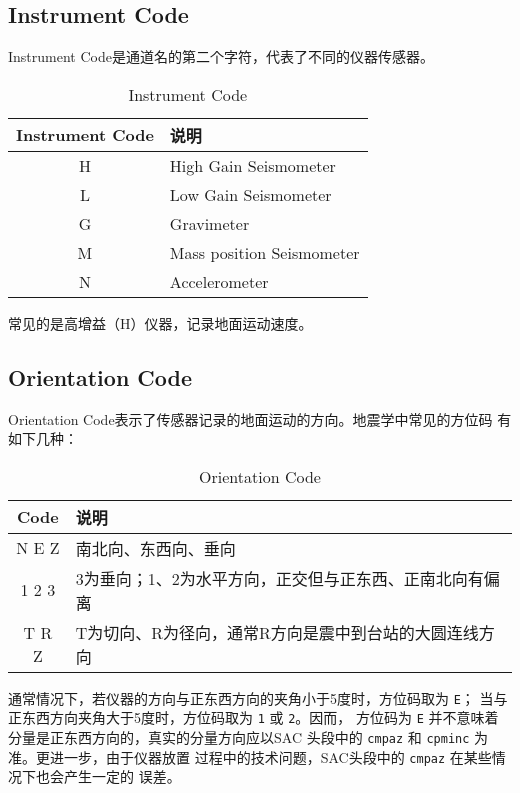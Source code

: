 \subsection{Instrument Code}
Instrument Code是通道名的第二个字符，代表了不同的仪器传感器。
\begin{table}[H]
\centering
\caption{Instrument Code}
\begin{tabular}{cl}
\toprule
Instrument Code    &     说明   \\
\midrule
H        &       High Gain Seismometer      \\
L        &       Low Gain Seismometer       \\
G        &       Gravimeter                 \\
M        &       Mass position Seismometer  \\
N        &       Accelerometer              \\
\bottomrule
\end{tabular}
\end{table}
常见的是高增益（H）仪器，记录地面运动速度。

\subsection{Orientation Code}
Orientation Code表示了传感器记录的地面运动的方向。地震学中常见的方位码
有如下几种：
\begin{table}[H]
\centering
\caption{Orientation Code}
\begin{tabular}{cl}
\toprule
Code    &   说明   \\
\midrule
N E Z   &   南北向、东西向、垂向   \\
1 2 3   &   3为垂向；1、2为水平方向，正交但与正东西、正南北向有偏离 \\
T R Z   &   T为切向、R为径向，通常R方向是震中到台站的大圆连线方向    \\
\bottomrule
\end{tabular}
\end{table}

通常情况下，若仪器的方向与正东西方向的夹角小于5度时，方位码取为 \texttt{E}；
当与正东西方向夹角大于5度时，方位码取为 \texttt{1} 或 \texttt{2}。因而，
方位码为 \texttt{E} 并不意味着分量是正东西方向的，真实的分量方向应以SAC
头段中的 \texttt{cmpaz} 和 \texttt{cpminc} 为准。更进一步，由于仪器放置
过程中的技术问题，SAC头段中的 \texttt{cmpaz} 在某些情况下也会产生一定的
误差。
